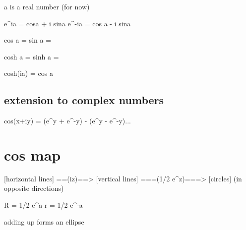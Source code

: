 \documentclass{article}
\begin{document}
a is a real number (for now)

e^ia = cosa + i sina
e^-ia = cos a - i sina

cos a = 
sin a = 

cosh a = 
sinh a = 

cosh(ia) = cos a

\subsection*{extension to complex numbers}

cos(x+iy) =  (e^y + e^{-y}) - (e^y - e^{-y})...

\section{cos map}

[horizontal lines] ==(iz)==> [vertical lines] 
===(1/2 e^z)===> [circles] (in opposite directions)

R = 1/2 e^a
r = 1/2 e^-a

adding up forms an ellipse
\end{document}

